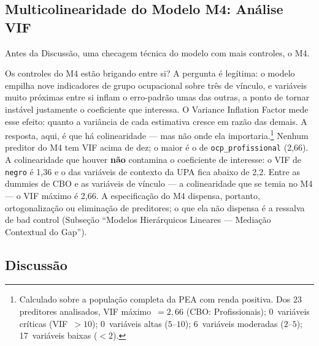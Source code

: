 \documentclass[11pt, a4paper, oneside]{article}
\begin{document}
\par
\medskip

\subsection*{Multicolinearidade do Modelo M4: Análise VIF}
Antes da Discussão, uma checagem técnica do modelo com mais controles, o M4. \label{subsec:vif}

Os controles do M4 estão brigando entre si? A pergunta é legítima: o modelo empilha nove indicadores de grupo ocupacional sobre três de vínculo, e variáveis muito próximas entre si inflam o erro-padrão umas das outras, a ponto de tornar instável justamente o coeficiente que interessa. O {Variance Inflation Factor} mede esse efeito: quanto a variância de cada estimativa cresce em razão das demais. A resposta, aqui, é que há colinearidade --- mas não onde ela importaria.\footnote{Calculado sobre a população completa da PEA com renda positiva. Dos $23$ preditores analisados, VIF máximo~$= 2,66$
(CBO: Profissionais); 0~variáveis críticas
(VIF~$> 10$); 0~variáveis altas ($5$--$10$);
6~variáveis moderadas ($2$--$5$);
17~variáveis baixas ($< 2$).}
Nenhum preditor do M4 tem VIF acima de dez; o maior é o de \texttt{ocp\_profissional} (2,66). A colinearidade que houver \textbf{não} contamina o coeficiente de
interesse: o VIF de
\texttt{negro} é 1,36 e o das variáveis de contexto da UPA fica abaixo de
2,2. Entre as {dummies} de CBO e as variáveis de vínculo --- a
colinearidade que se temia no M4 --- o VIF máximo é 2,66. A especificação
do M4 dispensa, portanto, ortogonalização ou eliminação de preditores; o que ela
não dispensa é a ressalva de {bad control} (Subseção ``Modelos Hierárquicos Lineares --- Mediação Contextual do Gap'').

\subsection*{Discussão}
\label{sec:discussao}
\end{document}
